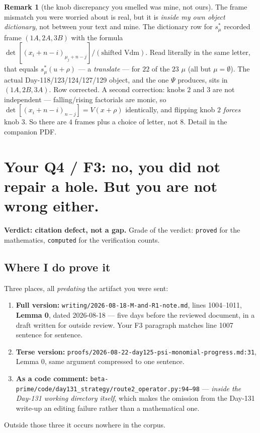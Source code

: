 \documentclass[11pt,a4paper]{article}
\theoremstyle{plain}
\theoremstyle{definition}
\newtheorem{remark}[theorem]{Remark}
\begin{document}
\begin{remark}[the knob discrepancy you smelled was mine, not ours]
The frame mismatch you were worried about is real, but it is \emph{inside my own object
dictionary}, not between your text and mine. The dictionary row for $s^*_\mu$ recorded
frame $(1A,2A,3B)$ with the formula $\det[(x_i+n-i)_{\mu_j+n-j}]/(\text{shifted Vdm})$. Read
literally in the same letter, that equals $s^*_\mu(u+\rho)$ --- a \emph{translate} --- for
$22$ of the $23$ $\mu$ (all but $\mu=\emptyset$). The actual Day-118/123/124/127/129 object,
and the one $\Psi$ produces, sits in $(1A,2B,3A)$. Row corrected. A second correction:
knobs $2$ and $3$ are not independent --- falling/rising factorials are monic, so
$\det[(x_i+n-i)_{n-j}]=V(x+\rho)$ identically, and flipping knob $2$ \emph{forces} knob $3$.
So there are $4$ frames plus a choice of letter, not $8$. Detail in the companion PDF.
\end{remark}

\section{Your Q4 / F3: no, you did not repair a hole. But you are not wrong either.}

\textbf{Verdict: citation defect, not a gap.} Grade of the verdict: \texttt{proved} for the
mathematics, \texttt{computed} for the verification counts.

\subsection*{Where I do prove it}

Three places, all \emph{predating} the artifact you were sent:
\begin{enumerate}
\item \textbf{Full version:} \texttt{writing/2026-08-18-M-and-R1-note.md}, lines
1004--1011, \textbf{Lemma 0}, dated 2026-08-18 --- five days before the reviewed document,
in a draft written for outside review. Your F3 paragraph matches line 1007 sentence for
sentence.
\item \textbf{Terse version:} \texttt{proofs/2026-08-22-day125-psi-monomial-progress.md:31},
Lemma 0, same argument compressed to one sentence.
\item \textbf{As a code comment:} \texttt{beta-prime/code/day131\_strategy/route2\_operator.py:94--98}
--- \emph{inside the Day-131 working directory itself}, which makes the omission from the
Day-131 write-up an editing failure rather than a mathematical one.
\end{enumerate}
Outside those three it occurs nowhere in the corpus.
\end{document}
